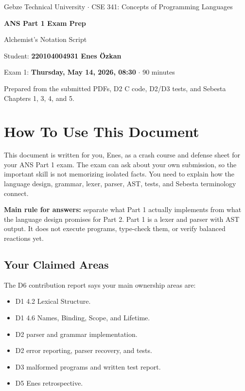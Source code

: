 \documentclass[11pt,a4paper]{article}
\begin{document}
\begin{center}
  {\footnotesize\color{ansgray}Gebze Technical University \(\cdot\) CSE 341: Concepts of Programming Languages\par}
  \vspace{8pt}
  {\Huge\bfseries\sffamily ANS Part 1 Exam Prep\par}
  \vspace{4pt}
  {\Large Alchemist's Notation Script\par}
  \vspace{8pt}
  {\normalsize Student: \textbf{220104004931 Enes \"Ozkan}\par}
  {\normalsize Exam 1: \textbf{Thursday, May 14, 2026, 08:30} \(\cdot\) 90 minutes\par}
  \vspace{8pt}
  {\small Prepared from the submitted PDFs, D2 C code, D2/D3 tests, and Sebesta Chapters 1, 3, 4, and 5.}
\end{center}

\vspace{8pt}
\tableofcontents
\newpage

\section{How To Use This Document}

This document is written for you, Enes, as a crash course and defense sheet for your ANS Part 1 exam. The exam can ask about your own submission, so the important skill is not memorizing isolated facts. You need to explain how the language design, grammar, lexer, parser, AST, tests, and Sebesta terminology connect.

\textbf{Main rule for answers:} separate what Part 1 actually implements from what the language design promises for Part 2. Part 1 is a lexer and parser with AST output. It does not execute programs, type-check them, or verify balanced reactions yet.

\subsection{Your Claimed Areas}

The D6 contribution report says your main ownership areas are:

\begin{itemize}
  \item D1 4.2 Lexical Structure.
  \item D1 4.6 Names, Binding, Scope, and Lifetime.
  \item D2 parser and grammar implementation.
  \item D2 error reporting, parser recovery, and tests.
  \item D3 malformed programs and written test report.
  \item D5 Enes retrospective.
\end{itemize}
\end{document}
